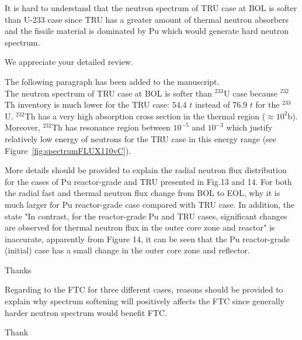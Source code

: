 \documentclass[answers,11pt]{exam}
\begin{document}
\begin{questions}
\begin{solution}
        \end{solution}

        \question It is hard to understand that the neutron spectrum of TRU case at BOL is softer than U-233 case since TRU has a greater amount of thermal neutron absorbers and the fissile material is dominated by Pu which would generate hard neutron spectrum.
        
        \begin{solution}
                 We appreciate your detailed review. 
                  
                 The following paragraph has been added to the manuscript.\\
                 The neutron spectrum of TRU case at BOL is softer than $^{233}$U case because $^{232}$Th inventory is much lower for the TRU case: $54.4$ $t$ instead of $76.9$ $t$ for the $^{233}$U. $^{232}$Th has a very high absorption cross section in the thermal region ($\approx10^2 $b). Moreover, $^{232}$Th has resonance region between $10^{-5}$ and $10^{-3}$ which justify relatively low energy of neutrons for the TRU case in this energy range (see Figure~\ref{fig:spectrumFLUX110vC}). 
                 
        \end{solution}

        \question More details should be provided to explain the radial neutron flux distribution for the cases of Pu reactor-grade and TRU presented in Fig.13 and 14. For both the radial fast and thermal neutron flux change from BOL to EOL, why it is much larger for Pu reactor-grade case compared with TRU case. In addition, the state "In contrast, for the reactor-grade Pu and TRU cases, significant changes are observed for thermal neutron flux in the outer core zone and reactor" is inaccurate, apparently from Figure 14, it can be seen that the Pu reactor-grade (initial) case has a small change in the outer core zone and reflector.
        \begin{solution}
                Thanks  
        \end{solution}

        \question Regarding to the FTC for three different cases, reasons should be provided to explain why spectrum softening will positively affects the FTC since generally harder neutron spectrum would benefit FTC.
        \begin{solution}
                Thank  
        \end{solution}


\end{questions}
\end{document}
